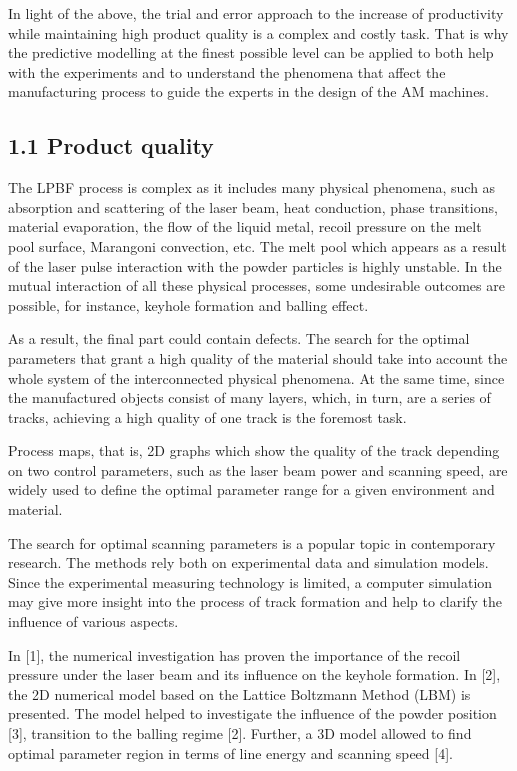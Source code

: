 \documentclass[10pt]{article}
\begin{document}
In light of the above, the trial and error approach to the increase of productivity while maintaining high product quality is a complex and costly task. That is why the predictive modelling at the finest possible level can be applied to both help with the experiments and to understand the phenomena that affect the manufacturing process to guide the experts in the design of the AM machines.

\subsection*{1.1 Product quality}
The LPBF process is complex as it includes many physical phenomena, such as absorption and scattering of the laser beam, heat conduction, phase transitions, material evaporation, the flow of the liquid metal, recoil pressure on the melt pool surface, Marangoni convection, etc. The melt pool which appears as a result of the laser pulse interaction with the powder particles is highly unstable. In the mutual interaction of all these physical processes, some undesirable outcomes are possible, for instance, keyhole formation and balling effect.

As a result, the final part could contain defects. The search for the optimal parameters that grant a high quality of the material should take into account the whole system of the interconnected physical phenomena. At the same time, since the manufactured objects consist of many layers, which, in turn, are a series of tracks, achieving a high quality of one track is the foremost task.

Process maps, that is, 2D graphs which show the quality of the track depending on two control parameters, such as the laser beam power and scanning speed, are widely used to define the optimal parameter range for a given environment and material.

The search for optimal scanning parameters is a popular topic in contemporary research. The methods rely both on experimental data and simulation models. Since the experimental measuring technology is limited, a computer simulation may give more insight into the process of track formation and help to clarify the influence of various aspects.

In [1], the numerical investigation has proven the importance of the recoil pressure under the laser beam and its influence on the keyhole formation. In [2], the 2D numerical model based on the Lattice Boltzmann Method (LBM) is presented. The model helped to investigate the influence of the powder position [3], transition to the balling regime [2]. Further, a 3D model allowed to find optimal parameter region in terms of line energy and scanning speed [4].
\end{document}

